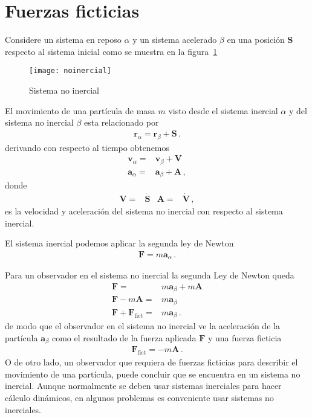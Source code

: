 \section{Fuerzas ficticias}
\begin{frame}
Considere un sistema en reposo $\alpha$ y un sistema acelerado $\beta$ en una posición $\mathbf{S}$ respecto al sistema inicial como se muestra en la figura~\ref{fig:noinercial}
\begin{figure}
  \centering
  \texttt{[image: noinercial]}
  \caption{Sistema no inercial}
  \label{fig:noinercial}
\end{figure}

El movimiento de una partícula de masa $m$ visto desde el sistema inercial $\alpha$ y del sistema no inercial $\beta$ esta relacionado por
\begin{align*}
  \mathbf{r}_\alpha=\mathbf{r}_\beta+\mathbf{S}\,.
\end{align*}
derivando con respecto al tiempo obtenemos
\begin{align*}
   \mathbf{v}_\alpha=&\mathbf{v}_\beta+\mathbf{V}\nonumber\\
   \mathbf{a}_\alpha=&\mathbf{a}_\beta+\mathbf{A}\,,
\end{align*}
donde
\begin{align*}
  \mathbf{V}=&\dot{\mathbf{S}} &   \mathbf{A}=&\dot{\mathbf{V}}\,,  
\end{align*}
es la velocidad y aceleración del sistema no inercial con respecto al sistema inercial. 

El sistema inercial podemos aplicar la segunda ley de Newton
\begin{align*}
  \mathbf{F}=m \mathbf{a}_\alpha\,.
\end{align*}

Para un observador en el sistema no inercial la segunda Ley de Newton queda
\begin{align*}
  \mathbf{F}=&m \mathbf{a}_\beta+m\mathbf{A}\nonumber\\
  \mathbf{F}-m\mathbf{A}=&m \mathbf{a}_\beta\nonumber\\
  \mathbf{F}+\mathbf{F}_{\text{fict}}=&m \mathbf{a}_\beta\,.
\end{align*}
de modo que el observador en el sistema no inercial ve la aceleración de la partícula $\mathbf{a}_\beta$ como el resultado de la fuerza aplicada $\mathbf{F}$ y una fuerza ficticia
\begin{align*}
  \mathbf{F}_{\text{fict}}=-m\mathbf{A}\,.
\end{align*}
O de otro lado, un observador que requiera de fuerzas ficticias para describir el movimiento de una partícula, puede concluir que se encuentra en un sistema no inercial. Aunque normalmente se deben usar sistemas inerciales para hacer cálculo dinámicos, en algunos problemas es conveniente usar sistemas no inerciales.


\end{frame}
